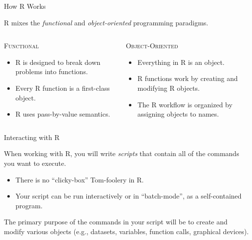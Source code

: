 \documentclass[10pt]{beamer}
\newcommand{\rmsc}[1]{\textrm{\textsc{#1}}}
\begin{document}
\begin{frame}{How R Works}
  
  R mixes the \emph{functional} and \emph{object-oriented} programming
  paradigms.
  \vc
  \begin{columns}
    \begin{column}{0.5\textwidth}
      
      \begin{center}
        \rmsc{Functional}
      \end{center}
      
      \begin{itemize}
      \item R is designed to break down problems into functions.
        \vc
      \item Every R function is a first-class object.
        \vc
      \item R uses pass-by-value semantics.
      \end{itemize}
      
    \end{column}
    \begin{column}{0.5\textwidth}
      
      \begin{center}
        \rmsc{Object-Oriented}
      \end{center}
      
      \begin{itemize}
      \item Everything in R is an object.
        \vc
      \item R functions work by creating and modifying R objects.
        \vc
      \item The R workflow is organized by assigning objects to names.
      \end{itemize}
      
    \end{column}
  \end{columns}
  
\end{frame}


\begin{frame}{Interacting with R}

  When working with R, you will write \emph{scripts} that contain all of the 
  commands you want to execute.
  \va
  \begin{itemize}
    \item There is no ``clicky-box'' Tom-foolery in R.
    \vb
    \item Your script can be run interactively or in ``batch-mode'', as a 
      self-contained program.
  \end{itemize}
  \va
  The primary purpose of the commands in your script will be to create and 
  modify various objects (e.g., datasets, variables, function calls, graphical 
  devices).

\end{frame}
\end{document}
